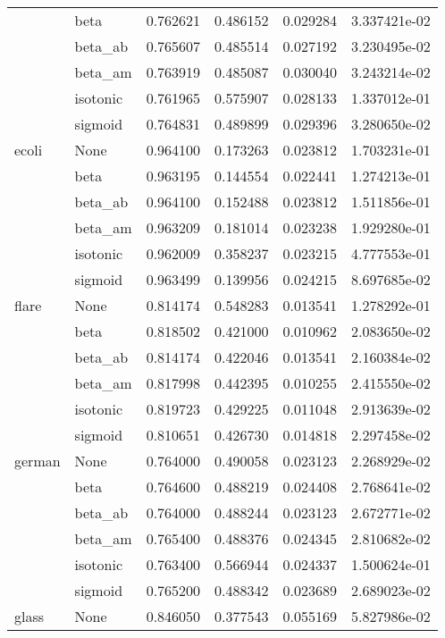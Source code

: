 \begin{tabular}{llrrrr}
        & beta &  0.762621 &  0.486152 &  0.029284 &  3.337421e-02 \\
        & beta\_ab &  0.765607 &  0.485514 &  0.027192 &  3.230495e-02 \\
        & beta\_am &  0.763919 &  0.485087 &  0.030040 &  3.243214e-02 \\
        & isotonic &  0.761965 &  0.575907 &  0.028133 &  1.337012e-01 \\
        & sigmoid &  0.764831 &  0.489899 &  0.029396 &  3.280650e-02 \\
ecoli & None &  0.964100 &  0.173263 &  0.023812 &  1.703231e-01 \\
        & beta &  0.963195 &  0.144554 &  0.022441 &  1.274213e-01 \\
        & beta\_ab &  0.964100 &  0.152488 &  0.023812 &  1.511856e-01 \\
        & beta\_am &  0.963209 &  0.181014 &  0.023238 &  1.929280e-01 \\
        & isotonic &  0.962009 &  0.358237 &  0.023215 &  4.777553e-01 \\
        & sigmoid &  0.963499 &  0.139956 &  0.024215 &  8.697685e-02 \\
flare & None &  0.814174 &  0.548283 &  0.013541 &  1.278292e-01 \\
        & beta &  0.818502 &  0.421000 &  0.010962 &  2.083650e-02 \\
        & beta\_ab &  0.814174 &  0.422046 &  0.013541 &  2.160384e-02 \\
        & beta\_am &  0.817998 &  0.442395 &  0.010255 &  2.415550e-02 \\
        & isotonic &  0.819723 &  0.429225 &  0.011048 &  2.913639e-02 \\
        & sigmoid &  0.810651 &  0.426730 &  0.014818 &  2.297458e-02 \\
german & None &  0.764000 &  0.490058 &  0.023123 &  2.268929e-02 \\
        & beta &  0.764600 &  0.488219 &  0.024408 &  2.768641e-02 \\
        & beta\_ab &  0.764000 &  0.488244 &  0.023123 &  2.672771e-02 \\
        & beta\_am &  0.765400 &  0.488376 &  0.024345 &  2.810682e-02 \\
        & isotonic &  0.763400 &  0.566944 &  0.024337 &  1.500624e-01 \\
        & sigmoid &  0.765200 &  0.488342 &  0.023689 &  2.689023e-02 \\
glass & None &  0.846050 &  0.377543 &  0.055169 &  5.827986e-02 \\

\end{tabular}

